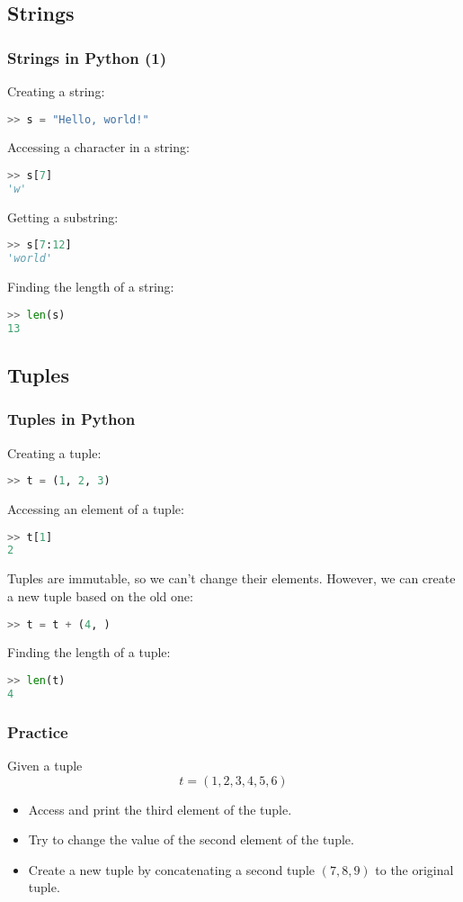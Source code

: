 \subsection*{Strings}
\begin{frame}[fragile]
  \frametitle{Strings in Python (1)}
  Creating a string:
  \begin{lstlisting}[language=Python,numbers=none]
>> s = "Hello, world!"
  \end{lstlisting}\pause
  Accessing a character in a string:
  \begin{lstlisting}[language=Python,numbers=none]
>> s[7]
'w'
  \end{lstlisting}\pause
  Getting a substring:
  \begin{lstlisting}[language=Python,numbers=none]
>> s[7:12]
'world'
  \end{lstlisting}\pause
  Finding the length of a string:
  \begin{lstlisting}[language=Python,numbers=none]
>> len(s)
13
  \end{lstlisting}
\end{frame}

\subsection*{Tuples}
\begin{frame}[fragile]
  \frametitle{Tuples in Python}
  Creating a tuple:
  \begin{lstlisting}[language=Python,numbers=none]
>> t = (1, 2, 3)
  \end{lstlisting}\pause
  Accessing an element of a tuple:
  \begin{lstlisting}[language=Python,numbers=none]
>> t[1]
2
  \end{lstlisting}\pause
  Tuples are immutable, so we can't change their elements. However, we can create a new tuple based on the old one:
  \begin{lstlisting}[language=Python,numbers=none]
>> t = t + (4, )
  \end{lstlisting}\pause
  Finding the length of a tuple:
  \begin{lstlisting}[language=Python,numbers=none]
>> len(t)
4
  \end{lstlisting}
\end{frame}

\begin{frame}[fragile]
  \frametitle{Practice}
  Given a tuple
  \[
     t = (1, 2, 3, 4, 5, 6)
  \]
  \begin{itemize}
   \item Access and print the third element of the tuple.\pause
   \item Try to change the value of the second element of the tuple.\pause
   \item Create a new tuple by concatenating a second tuple \((7, 8, 9)\) to the original tuple.
  \end{itemize}
 \end{frame}


